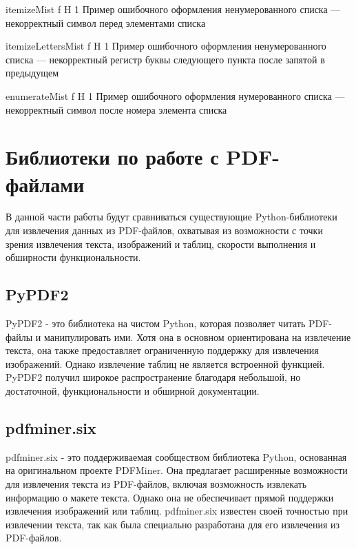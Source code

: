 {itemizeMist} %
{f} %
{H} %
{1\textwidth} %
{Пример ошибочного оформления ненумерованного списка --- некорректный символ перед элементами списка} %

{itemizeLettersMist} %
{f} %
{H} %
{1\textwidth} %
{Пример ошибочного оформления ненумерованного списка --- некорректный регистр буквы следующего пункта после запятой в предыдущем} %

{enumerateMist} %
{f} %
{H} %
{1\textwidth} %
{Пример ошибочного оформления нумерованного списка --- некорректный символ после номера элемента списка} %

\section{Библиотеки по работе с PDF-файлами}
В данной части работы будут сравниваться существующие Python-библиотеки для извлечения данных из PDF-файлов, охватывая из возможности с точки зрения извлечения текста, изображений и таблиц, скорости выполнения и обширности функциональности.
\subsection{PyPDF2}
PyPDF2 - это библиотека на чистом Python, которая позволяет читать PDF-файлы и манипулировать ими. Хотя она в основном ориентирована на извлечение текста, она также предоставляет ограниченную поддержку для извлечения изображений. Однако извлечение таблиц не является встроенной функцией. PyPDF2 получил широкое распространение благодаря небольшой, но достаточной, функциональности и обширной документации.
\subsection{pdfminer.six}
pdfminer.six - это поддерживаемая сообществом библиотека Python, основанная на оригинальном проекте PDFMiner. Она предлагает расширенные возможности для извлечения текста из PDF-файлов, включая возможность извлекать информацию о макете текста. Однако она не обеспечивает прямой поддержки извлечения изображений или таблиц. pdfminer.six известен своей точностью при извлечении текста, так как была специально разработана для его извлечения из PDF-файлов.
